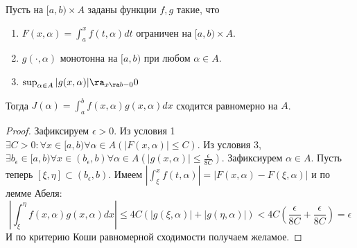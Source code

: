 \begin{theorem}
    Пусть на \([a, b) \times A\) заданы функции \(f, g\) такие, что
    \begin{enumerate}
        \item \(F(x, \alpha) = \int_a^xf(t, \alpha)dt\) ограничен на \([a, b) \times A\).
        \item \(g(\cdot, \alpha)\) монотонна на \([a, b)\) при любом \(\alpha \in A\).
        \item \(\sup_{\alpha \in A}|g(x, \alpha)| \ra_{x \ra b - 0} 0\)
    \end{enumerate}
    Тогда \(J(\alpha) = \int_a^b f(x, \alpha)g(x, \alpha)dx\) сходится равномерно на \(A\).
\end{theorem}
\begin{proof}
    Зафиксируем \(\epsilon > 0\). Из условия 1 \(\exists C > 0: \forall x \in [a, b) \forall \alpha \in A (|F(x, \alpha)| \le C)\). Из условия 3, \(\exists b_\epsilon \in [a, b) \forall x \in (b_\epsilon, b) \forall \alpha \in A \left( |g(x, \alpha)| \le \frac{\epsilon}{8 C} \right)\). Зафиксиурем \(\alpha \in A\). Пусть теперь \([\xi, \eta] \subset (b_\epsilon, b)\). Имеем \(\left| \int_\xi^x f(t, \alpha) \right| = |F(x, \alpha) - F(\xi, \alpha)|\) и по лемме Абеля:
    \[\left| \int_\xi^\eta f(x, \alpha)g(x, \alpha)dx \right| \le 4C(|g(\xi, \alpha)| + |g(\eta, \alpha)|) < 4C\left( \frac{\epsilon}{8C} + \frac{\epsilon}{8C} \right) = \epsilon\]
    И по критерию Коши равномерной сходимости получаем желамое.
\end{proof}

